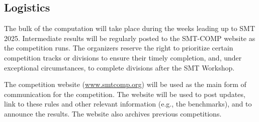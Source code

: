 \documentclass[12pt]{article}
\begin{document}


\subsection{Logistics}
\label{sec:logistics}

%
The bulk of the computation will take place during the weeks leading
up to SMT 2025.  Intermediate results will be regularly posted to the
SMT-COMP website as the competition runs.
%
The organizers reserve the right to prioritize certain competition
tracks or divisions to ensure their timely completion, and, under
exceptional circumstances, to complete divisions after the SMT
Workshop.

The competition website (\url{www.smtcomp.org}) will be used as the main form
of communication for the competition. The website will be used to post updates,
link to these rules and other relevant information (e.g., the benchmarks), and
to announce the results. The website also archives previous
competitions.
%
\end{document}
